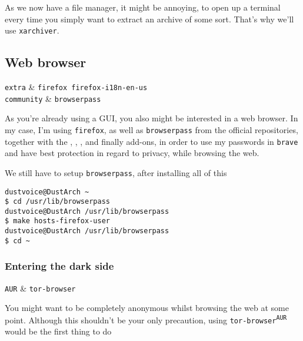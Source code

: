 \documentclass[10pt]{dustdoc}
\begin{document}
As we now have a file manager, it might be annoying, to open up a terminal every time you simply want to extract an archive of some sort.
That’s why we’ll use \texttt{xarchiver}.

\subsection{Web browser}
\label{sec:web-browser}

\begin{packagetable}
    \texttt{extra} & \texttt{firefox firefox-i18n-en-us} \\
    \texttt{community} & \texttt{browserpass} \\
\end{packagetable}

As you’re already using a GUI, you also might be interested in a web browser.
In my case, I’m using \texttt{firefox}, as well as \texttt{browserpass} from the official repositories, together with the , , ,  and finally  add-ons, in order to use my passwords in \texttt{brave} and have best protection in regard to privacy, while browsing the web.

We still have to setup \texttt{browserpass}, after installing all of this

\begin{verbatim}
dustvoice@DustArch ~
$ cd /usr/lib/browserpass
dustvoice@DustArch /usr/lib/browserpass
$ make hosts-firefox-user
dustvoice@DustArch /usr/lib/browserpass
$ cd ~
\end{verbatim}

\subsubsection{Entering the dark side}
\label{sec:entering-the-dark-side}

\begin{packagetable}
    \texttt{AUR} & \texttt{tor-browser} \\
\end{packagetable}

You might want to be completely anonymous whilst browsing the web at some point.
Although this shouldn’t be your only precaution, using \texttt{tor-browser\textsuperscript{\texttt{AUR}}} would be the first thing to do
\end{document}
